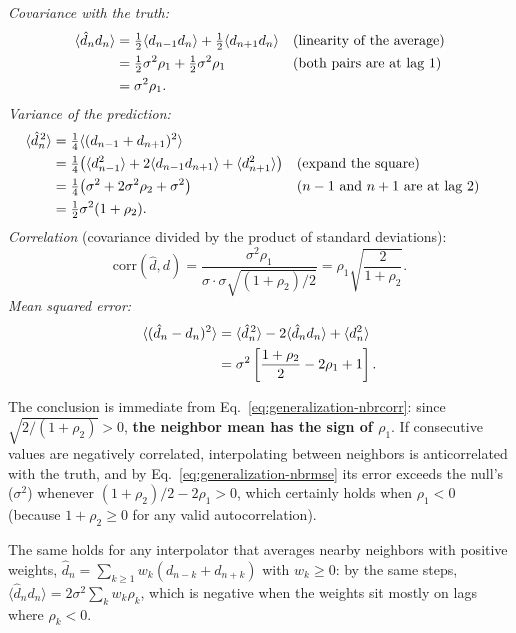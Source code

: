\emph{Covariance with the truth:}
\begin{align}
\langle\hat d_nd_n\rangle&=\tfrac12\langle d_{n-1}d_n\rangle+\tfrac12\langle d_{n+1}d_n\rangle&&\text{(linearity of the average)}\notag\\
&=\tfrac12\sigma^2\rho_1+\tfrac12\sigma^2\rho_1&&\text{(both pairs are at lag 1)}\notag\\
&=\sigma^2\rho_1.
\end{align}
\emph{Variance of the prediction:}
\begin{align}
\langle\hat d_n^{\,2}\rangle&=\tfrac14\langle(d_{n-1}+d_{n+1})^2\rangle\notag\\
&=\tfrac14\bigl(\langle d_{n-1}^2\rangle+2\langle d_{n-1}d_{n+1}\rangle+\langle d_{n+1}^2\rangle\bigr)&&\text{(expand the square)}\notag\\
&=\tfrac14\bigl(\sigma^2+2\sigma^2\rho_2+\sigma^2\bigr)&&\text{($n-1$ and $n+1$ are at lag 2)}\notag\\
&=\tfrac12\sigma^2(1+\rho_2).
\end{align}
\emph{Correlation} (covariance divided by the product of standard deviations):
\begin{equation}
\mathrm{corr}(\hat d,d)=\frac{\sigma^2\rho_1}{\sigma\cdot\sigma\sqrt{(1+\rho_2)/2}}=\rho_1\sqrt{\frac{2}{1+\rho_2}}.
\label{eq:generalization-nbrcorr}
\end{equation}
\emph{Mean squared error:}
\begin{align}
\langle(\hat d_n-d_n)^2\rangle&=\langle\hat d_n^{\,2}\rangle-2\langle\hat d_nd_n\rangle+\langle d_n^2\rangle\notag\\
&=\sigma^2\left[\frac{1+\rho_2}{2}-2\rho_1+1\right].
\label{eq:generalization-nbrmse}
\end{align}

The conclusion is immediate from Eq.~\eqref{eq:generalization-nbrcorr}: since $\sqrt{2/(1+\rho_2)}>0$, \textbf{the neighbor mean has the sign of $\rho_1$}. If consecutive values are negatively correlated, interpolating between neighbors is anticorrelated with the truth, and by Eq.~\eqref{eq:generalization-nbrmse} its error exceeds the null's ($\sigma^2$) whenever $(1+\rho_2)/2-2\rho_1>0$, which certainly holds when $\rho_1<0$ (because $1+\rho_2\ge0$ for any valid autocorrelation).

The same holds for any interpolator that averages nearby neighbors with positive weights, $\hat d_n=\sum_{k\ge1}w_k(d_{n-k}+d_{n+k})$ with $w_k\ge0$: by the same steps, $\langle\hat d_nd_n\rangle=2\sigma^2\sum_kw_k\rho_k$, which is negative when the weights sit mostly on lags where $\rho_k<0$.

